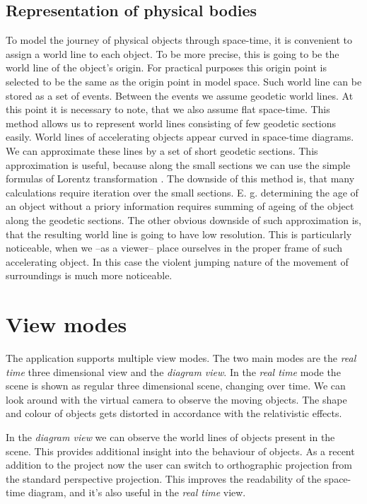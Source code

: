 \documentclass{egpubl}
\begin{document}
\subsection{Representation of physical bodies}
To model the journey of physical objects through space-time, it is convenient to assign a world line to each object. To be more precise, this is going to be the world line of the object's origin. For practical purposes this origin point is selected to be the same as the origin point in model space. Such world line can be stored as a set of events. Between the events we assume geodetic world lines. At this point it is necessary to note, that we also assume flat space-time. This method allows us to represent world lines consisting of few geodetic sections easily. World lines of accelerating objects appear curved in space-time diagrams. We can approximate these lines by a set of short geodetic sections. This approximation is useful, because along the small sections we can use the simple formulas of Lorentz transformation . The downside of this method is, that many calculations require iteration over the small sections. E. g. determining the age of an object without a priory information requires summing of ageing of the object along the geodetic sections. The other obvious downside of such approximation is, that the resulting world line is going to have low resolution. This is particularly noticeable, when we --as a viewer-- place ourselves in the proper frame of such accelerating object. In this case the violent jumping nature of the movement of surroundings is much more noticeable.

\section{View modes}
The application supports multiple view modes. The two main modes are the \emph{real time} three dimensional view and the \emph{diagram view}. In the \emph{real time} mode the scene is shown as regular three dimensional scene, changing over time. We can look around with the virtual camera to observe the moving objects. The shape and colour of objects gets distorted in accordance with the relativistic effects. 

In the \emph{diagram view} we can observe the world lines of objects present in the scene. This provides additional insight into the behaviour of objects. As a recent addition to the project now the user can switch to orthographic projection from the standard perspective projection. This improves the readability of the space-time diagram, and it's also useful in the \emph{real time} view.
\end{document}
